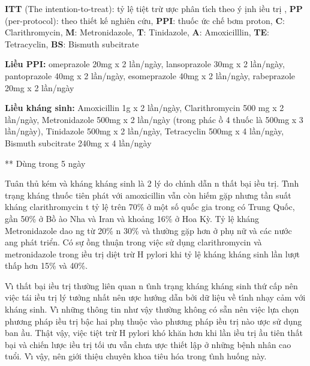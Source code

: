 \documentclass[9pt,twocolumn]{article}
\begin{document}
\textbf{ITT} (The intention-to-treat): tỷ l{\^{\d{e}}} ti{\^{\d{e}}}t trừ \text{\dj}ược ph\^{a}n t\'{\i}ch theo \'{y} \text{\dj}\d{i}nh \text{\dj}iều tr\d{i} , \textbf{PP} (per-protocol): theo thi{{\'{\^{e}}}}t k{{\'{\^{e}}}} nghi{\^{e}}n cứu, \textbf{PPI}: thuốc ức ch{{\'{\^{e}}}} bơm proton, \textbf{C}: Clarithromycin, \textbf{M}: Metronidazole, \textbf{T}: Tinidazole, \textbf{A}: Amoxicilllin, \textbf{TE}: Tetracyclin, \textbf{BS}: Bismuth subcitrate

\textbf{Liều PPI: }omeprazole 20mg x 2 lần/ng\`{a}y, lansoprazole 30mg x 2 lần/ng\`{a}y, pantoprazole 40mg x 2 lần/ng\`{a}y, esomeprazole 40mg x 2 lần/ng\`{a}y, rabeprazole 20mg x 2 lần/ng\`{a}y

\textbf{Liều kh\'{a}ng sinh: }Amoxicillin 1g x 2 lần/ng\`{a}y, Clarithromycin 500 mg x 2 lần/ng\`{a}y, Metronidazole 500mg x 2 lần/ng\`{a}y (trong ph\'{a}c \text{\dj}ồ 4 thuốc l\`{a} 500mg x 3 lần/ng\`{a}y), Tinidazole 500mg x 2 lần/ng\`{a}y, Tetracyclin 500mg x 4 lần/ng\`{a}y, Bismuth subcitrate 240mg x 4 lần/ng\`{a}y

** D\`{u}ng trong 5 ng\`{a}y

Tu\^{a}n thủ k{\'e}m v\`{a} kh\'{a}ng kh\'{a}ng sinh l\`{a} 2 l\'{y} do ch\'{\i}nh dẫn n thất b{\d{a}}i \text{\dj}iều tr\d{i}. T\`{\i}nh tr{\d{a}}ng kh\'{a}ng thuốc ti{\^{e}}n ph\'{a}t với amoxicillin vẫn c\`{o}n hi{{\'{\^{e}}}}m gặp nhưng tần suất kh\'{a}ng clarithromycin  t tỷ l{\^{\d{e}}} tr{\^{e}}n 70\% ở m{\^{\d{o}}}t số quốc gia trong  c{\'{o}} Trung Quốc, gần 50\% ở Bồ \text{\DJ}\`{a}o Nha v\`{a} Iran v\`{a} khoảng 16\% ở Hoa Kỳ. Tỷ l{\^{\d{e}}} kh\'{a}ng Metronidazole dao ng từ 20\% n 30\% v\`{a} thường gặp hơn ở ph\d{u} nữ v\`{a} c\'{a}c nước \text{\dj}ang ph\'{a}t triển. C{\'{o}} sự \text{\dj}ồng thu{\^{\d{a}}}n trong vi{\^{\d{e}}}c sử d\d{u}ng clarithromycin v\`{a} metronidazole trong \text{\dj}iều tr\d{i} di{\^{\d{e}}}t trừ H pylori khi tỷ l{\^{\d{e}}} kh\'{a}ng kh\'{a}ng sinh lần lượt thấp hơn 15\% v\`{a} 40\%.

V\`{\i} thất b{\d{a}}i \text{\dj}iều tr\d{i} thường li{\^{e}}n quan n t\`{\i}nh tr{\d{a}}ng kh\'{a}ng kh\'{a}ng sinh thứ cấp n{\^{e}}n vi{\^{\d{e}}}c t\'{a}i \text{\dj}iều tr\d{i} l\'{y} tưởng nhất n{\^{e}}n \text{\dj}ược hướng dẫn bởi dữ li{\^{\d{e}}}u về t\'{\i}nh nh{\d{a}}y cảm với kh\'{a}ng sinh. V\`{\i} những th{\^o}ng tin như v{\^{\d{a}}}y thường kh{\^o}ng c{\'{o}} sẵn n{\^{e}}n vi{\^{\d{e}}}c lựa ch\d{o}n phương ph\'{a}p \text{\dj}iều tr\d{i} b{\^{\d{a}}}c hai ph\d{u} thu{\^{\d{o}}}c v\`{a}o phương ph\'{a}p \text{\dj}iều tr\d{i} n\`{a}o \text{\dj}ược sử d\d{u}ng ban \text{\dj}ầu. Th{\^{\d{a}}}t v{\^{\d{a}}}y, vi{\^{\d{e}}}c ti{\^{\d{e}}}t trừ H pylori kh{\'{o}} kh{\u{a}}n hơn khi lần \text{\dj}iều tr\d{i} \text{\dj}ầu ti{\^{e}}n thất b{\d{a}}i v\`{a} chi{{\'{\^{e}}}}n lược \text{\dj}iều tr\d{i} tối ưu vẫn chưa \text{\dj}ược thi{{\'{\^{e}}}}t l{\^{\d{a}}}p ở những b{\^{\d{e}}}nh nh\^{a}n cao tuổi. V\`{\i} v{\^{\d{a}}}y, n{\^{e}}n giới thi{\^{\d{e}}}u chuy{\^{e}}n khoa ti{\^{e}}u h{\'{o}}a trong t\`{\i}nh huống n\`{a}y.
\end{document}
